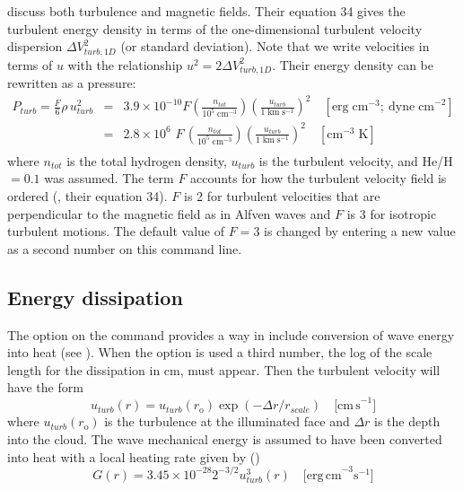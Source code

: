 \citet{HeilesTroland2005} discuss both turbulence and magnetic fields.
Their equation 34 gives the turbulent energy density in terms of the
one-dimensional turbulent velocity dispersion $\Delta V_{turb,1D}^2 $
(or standard deviation).
Note that we write velocities in terms of $u$
with the relationship $u^2  = 2\Delta V_{turb,1D}^2 $.
Their energy density can be rewritten as a pressure:
\begin{equation}
\begin{array}{ccl}
 P_{turb}  = \frac{F}{6}\rho \,u_{turb}^2&  =& 3.9 \times 10^{ - 10} F\left(
{\frac{{n_{tot} }}{{10^5 \;{\mathrm{cm}}^{ - 3} }}} \right)\left(
{\frac{{u_{turb} }}{{1\;{\mathrm{km}}\;{\mathrm{s}}^{ - 1} }}} \right)^2 \quad \left[
{{\mathrm{erg\; cm}}^{{\mathrm{ - 3}}} {\mathrm{;\ dyne\; cm}}^{ - 2}} \right] \\
&  =& 2.8 \times 10^6 \,\,F\,\left( {\frac{{n_{tot} }}{{10^5 \;{\mathrm{cm}}^{
- 3} }}} \right)\left( {\frac{{u_{turb} }}{{1\;{\mathrm{km}}\;{\mathrm{s}}^{ - 1}
}}} \right)^2 \quad \left[ {{\mathrm{cm}}^{ - 3} \;{\mathrm{K}}} \right] \\
 \end{array}
\end{equation}
where $n_{tot}$ is the total hydrogen density,
$u_{turb}$ is the turbulent velocity,
and He/H$ = 0.1$ was assumed.
The term $F$ accounts for how the turbulent
velocity field is ordered (\citealp{HeilesTroland2005}, their equation 34).
$F$ is 2 for turbulent velocities that are perpendicular to
the magnetic field
as in Alfven waves and $F$ is 3 for isotropic turbulent motions.
The default
value of $F = 3$ is changed by entering a new value as a second number on
this command line.

\subsection{Energy dissipation}

The  option on the 
command provides a way in include
conversion of wave energy into heat (see \citealp{BottorffFerland2002}).
When
the option is used a third number, the log of the scale length for the
dissipation in cm, must appear.
Then the turbulent velocity will have the form
\begin{equation}
u_{turb} (r) = u_{turb} (r_{\mathrm{o}} )\exp ( - \Delta r/r_{scale} )\quad
\mathrm{[cm\, s}^{-1}]%
\end{equation}
where $u_{turb}(r_{\mathrm{o}})$ is the turbulence at the illuminated face
and $\Delta r$ is the depth into the cloud.
The wave mechanical energy is assumed to have been
converted into heat with a local heating rate given by
(\citealp{BottorffFerland2002})
\begin{equation}
G(r) = 3.45 \times 10^{ - 28} 2^{ - 3/2} u_{turb}^3 (r) \quad
\mathrm{[erg\, cm}^{-3} \mathrm{s}^{-1}]%
\end{equation}

